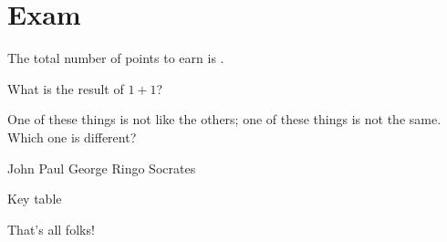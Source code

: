 \documentclass[answers,addpoints]{exam} %
\begin{document}
\section*{Exam}
The total number of points to earn is \numpoints.

\hrulefill


\begin{questions}


\question[5] What is the result of $1+1$?

\begin{randomizechoices}
\end{randomizechoices}


\question[5]
One of these things is not like the others; one of these
things is not the same. Which one is different?

\begin{randomizechoices}
\choice John
\choice Paul
\choice George
\choice Ringo
\CorrectChoice Socrates
\end{randomizechoices}

\end{questions}

\newpage

Key table

\printkeytable[1-30]





That's all folks!
\end{document}
